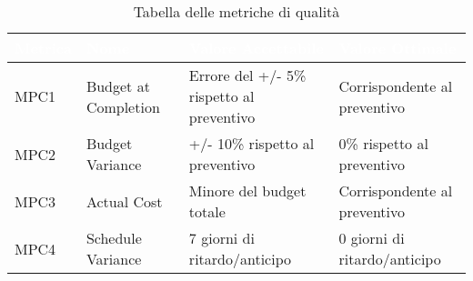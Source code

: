\begin{table}
  \renewcommand{\arraystretch}{1.25}
  \begin{tabular}{|p{1.7cm}|p{3.5cm}|p{4cm}|p{3.3cm}|} \hline
    \rowcolor[HTML]{036400}
    \textcolor{white}{\textbf{Metrica}} & \textcolor{white}{\textbf{Nome}} & \textcolor{white}{\textbf{Valore Accettabile}} & \textcolor{white}{\textbf{Valore Ottimale}}    \\ \hline
      \rowcolor[HTML]{EFEFEF}
      MPC1 & Budget at Completion & Errore del +/- 5\% rispetto al preventivo & Corrispondente al preventivo \\ \hline
      \rowcolor[HTML]{C0C0C0}
      MPC2 & Budget Variance    &  +/- 10\% rispetto al preventivo & 0\% rispetto al preventivo     \\ \hline
      \rowcolor[HTML]{EFEFEF}
      MPC3 & Actual Cost    & Minore del budget totale  & Corrispondente al preventivo     \\ \hline
      \rowcolor[HTML]{C0C0C0}
      MPC4 & Schedule Variance & 7 giorni di ritardo/anticipo & 0 giorni di ritardo/anticipo     \\ \hline
  \end{tabular}
  \caption{Tabella delle metriche di qualità}
\end{table}
